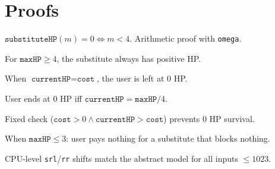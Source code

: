 \section{Proofs}

\begin{theorem}\label{thm:substitute_zero_iff}
  \leanok
  $\texttt{substituteHP}(m) = 0 \iff m < 4$. Arithmetic proof with \texttt{omega}.
\end{theorem}

\begin{theorem}\label{thm:substitute_positive}
  \leanok
  For $\texttt{maxHP} \ge 4$, the substitute always has positive HP.
\end{theorem}

\begin{theorem}\label{thm:user_zero_hp}
  \leanok
  When $\texttt{currentHP} = \texttt{cost}$, the user is left at 0 HP.
\end{theorem}

\begin{theorem}\label{thm:zero_hp_iff}
  \leanok
  User ends at 0 HP iff $\texttt{currentHP} = \texttt{maxHP}/4$.
\end{theorem}

\begin{theorem}\label{thm:fix_prevents_zero}
  \leanok
  Fixed check ($\texttt{cost} > 0 \land \texttt{currentHP} > \texttt{cost}$) prevents 0 HP survival.
\end{theorem}

\begin{theorem}\label{thm:both_bugs_interact}
  \leanok
  When $\texttt{maxHP} \le 3$: user pays nothing for a substitute that blocks nothing.
\end{theorem}

\begin{theorem}\label{thm:substitute_sm83}
  \leanok
  CPU-level \texttt{srl}/\texttt{rr} shifts match the abstract model for all inputs $\le 1023$.
\end{theorem}

